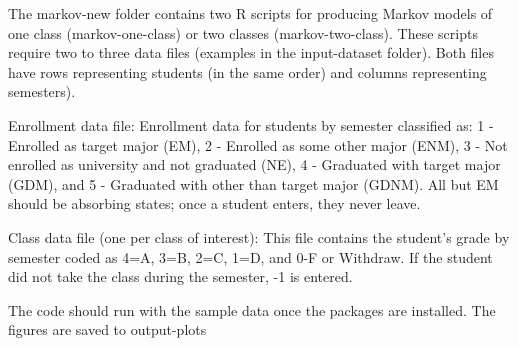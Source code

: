 The markov-new folder contains two R scripts for producing Markov
models of one class (markov-one-class) or two classes
(markov-two-class). These scripts require two to three data files
(examples in the input-dataset folder). Both files have rows
representing students (in the same order) and columns representing
semesters).

Enrollment data file: Enrollment data for students by semester
classified as: 1 - Enrolled as target major (EM), 2 - Enrolled as
some other major (ENM), 3 - Not enrolled as university and not
graduated (NE), 4 - Graduated with target major (GDM), and 5 -
Graduated with other than target major (GDNM). All but EM should
be absorbing states; once a student enters, they never leave.

Class data file (one per class of interest): This file contains
the student's grade by semester coded as 4=A, 3=B, 2=C, 1=D, and
0-F or Withdraw. If the student did not take the class during the
semester, -1 is entered.

The code should run with the sample data once the packages are
installed. The figures are saved to output-plots
